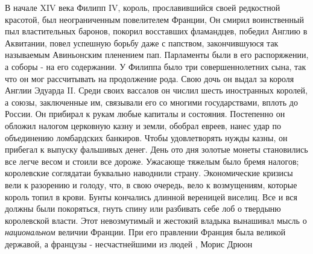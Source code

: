 В начале XIV века Филипп IV, король,  прославившийся  своей  редкостной
красотой, был неограниченным повелителем Франции, Он  смирил  воинственный пыл
властительных баронов, покорил восставших фламандцев, победил Англию в
Аквитании, повел  успешную  борьбу  даже  с  папством,  закончившуюся  так
называемым Авиньонским пленением пап. Парламенты были в его  распоряжении, а
соборы - на его содержании.  У Филиппа было три совершеннолетних сына, так что
он  мог  рассчитывать на продолжение рода. Свою дочь он выдал за короля Англии
Эдуарда II. Среди своих вассалов он числил шесть иностранных королей, а  союзы,
заключенные им, связывали его со многими государствами, вплоть до России.  Он
прибирал к рукам любые капиталы и состояния. Постепенно  он  обложил налогом
церковную казну и земли, обобрал евреев, нанес удар по объединению ломбардских
банкиров. Чтобы  удовлетворять  нужды  казны,  он  прибегал  к выпуску
фальшивых денег. День ото дня золотые монеты становились все легче весом  и
стоили  все  дороже.  Ужасающе  тяжелым  было   бремя налогов; королевские
соглядатаи буквально наводнили страну.  Экономические  кризисы вели к разорению
и голоду,  что,  в  свою  очередь,  вело  к  возмущениям, которые король топил
в крови. Бунты кончались длинной  вереницей  виселиц.  Все и вся должны были
покоряться, гнуть спину или  разбивать  себе  лоб  о твердыню королевской
власти.  Этот невозмутимый и жестокий владыка  вынашивал  мысль  о
\emph{национальном} величии Франции. При  его  правлении  Франция  была
великой державой,  а французы - несчастнейшими из людей
, Морис Дрюон

